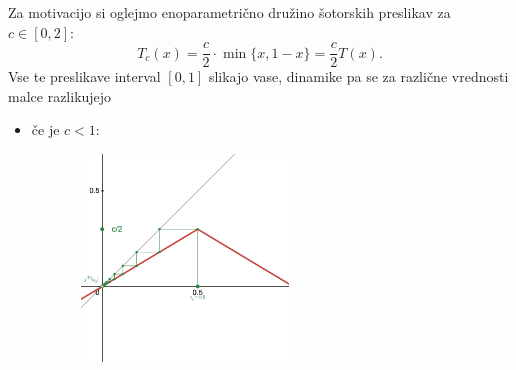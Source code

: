 \documentclass{article}
\begin{document}
Za motivacijo si oglejmo enoparametrično družino šotorskih preslikav za $c\in [0, 2]$:
$$
T_c(x) = \frac{c}{2}\cdot \min\{x, 1-x\} = \frac{c}{2} T(x).
$$
Vse te preslikave interval $[0, 1]$ slikajo vase, dinamike pa se za različne vrednosti malce razlikujejo
\newpage
\begin{itemize}
\item če je $c < 1$: 
\begin{figure}[h!]
    \begin{center}
        \includegraphics[width=6cm, height=5.5cm]{Grafi/cobweb141.png}
    \end{center}
\end{figure} 


\end{itemize}
\end{document}
